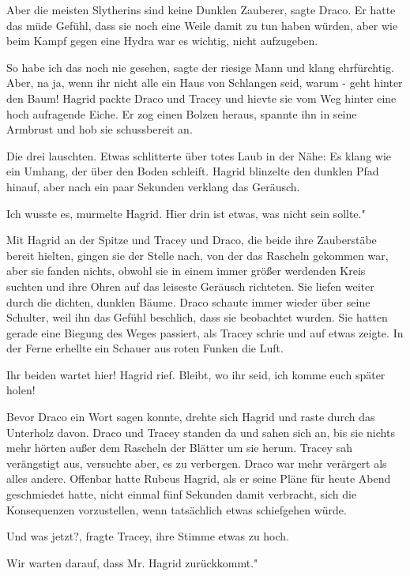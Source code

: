 \glqq{}Aber die meisten Slytherins sind keine Dunklen Zauberer\grqq{}, sagte
Draco. Er hatte das müde Gefühl, dass sie noch eine Weile damit zu tun
haben würden, aber wie beim Kampf gegen eine Hydra war es wichtig, nicht
aufzugeben.

\glqq{}So habe ich das noch nie gesehen\grqq{}, sagte der riesige Mann und klang
ehrfürchtig. \glqq{}Aber, na ja, wenn ihr nicht alle ein Haus von
Schlangen seid, warum - geht hinter den Baum!\grqq{} Hagrid packte Draco
und Tracey und hievte sie vom Weg hinter eine hoch aufragende Eiche. Er
zog einen Bolzen heraus, spannte ihn in seine Armbrust und hob sie
schussbereit an.

Die drei lauschten. Etwas schlitterte über totes Laub in der Nähe: Es klang wie
ein Umhang, der über den Boden schleift. Hagrid blinzelte den dunklen
Pfad hinauf, aber nach ein paar Sekunden verklang das Geräusch.

\glqq{}Ich wusste es\grqq{}, murmelte Hagrid. \glqq{}Hier drin ist etwas, was
nicht sein sollte."

Mit Hagrid an der Spitze und Tracey und Draco, die beide ihre Zauberstäbe bereit
hielten, gingen sie der Stelle nach, von der das Rascheln gekommen war,
aber sie fanden nichts, obwohl sie in einem immer größer werdenden Kreis
suchten und ihre Ohren auf das leiseste Geräusch richteten. Sie liefen
weiter durch die dichten, dunklen Bäume. Draco schaute immer wieder über
seine Schulter, weil ihn das Gefühl beschlich, dass sie beobachtet
wurden. Sie hatten gerade eine Biegung des Weges passiert, als Tracey
schrie und auf etwas zeigte. In der Ferne erhellte ein Schauer aus roten
Funken die Luft.

\glqq{}Ihr beiden wartet hier!\grqq{} Hagrid rief. \glqq{}Bleibt, wo ihr seid, ich
komme euch später holen!\grqq{}

Bevor Draco ein Wort sagen konnte, drehte sich Hagrid und raste durch das
Unterholz davon. Draco und Tracey standen da und sahen sich an, bis sie
nichts mehr hörten außer dem Rascheln der Blätter um sie herum. Tracey
sah verängstigt aus, versuchte aber, es zu verbergen. Draco war mehr
verärgert als alles andere. Offenbar hatte Rubeus Hagrid, als er seine
Pläne für heute Abend geschmiedet hatte, nicht einmal fünf Sekunden damit
verbracht, sich die Konsequenzen vorzustellen, wenn tatsächlich etwas
schiefgehen würde.

\glqq{}Und was jetzt?\grqq{}, fragte Tracey, ihre Stimme etwas zu hoch.

\glqq{}Wir warten darauf, dass Mr. Hagrid zurückkommt."

